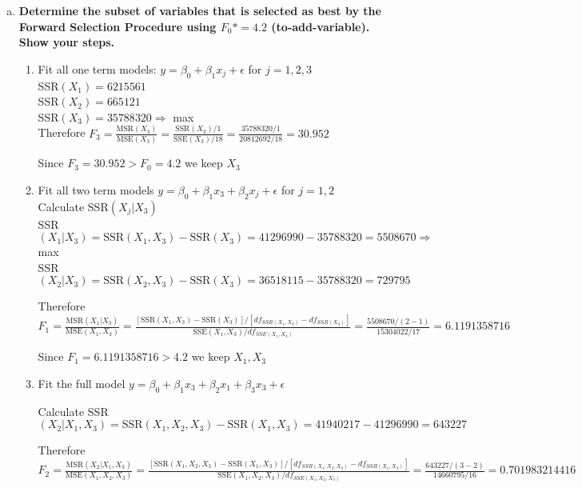 \documentclass{article}
\begin{document}
\begin{enumerate}[(a)]
\item \textbf{Determine the subset of variables that is selected as best by the Forward Selection Procedure using $F_0* = 4.2$ (to-add-variable). Show your steps. }

\begin{enumerate}[(1)]
\item Fit all one term models: $y = \beta_0 + \beta_1x_j + \epsilon$ for $j = 1,2,3$ \\
SSR$(X_1) = 6 215 561$ \\
SSR$(X_2) = 665 121$ \\
SSR$(X_3) = 35 788 320 \Rightarrow $ max \\

Therefore $F_3 = \frac{\text{MSR}(X_3)}{\text{MSE}(X_3)} = \frac{\text{SSR}(X_3)/1}{\text{SSE}(X_3)/18} = \frac{35 788 320/1}{20 812 692/18} = 30.952$

Since $F_3 = 30.952 > F_0 = 4.2$ we keep $X_3$

\item Fit all two term models $y = \beta_0 + \beta_1x_3 + \beta_2x_j + \epsilon$ for $j = 1,2$ \\

Calculate SSR$(X_j | X_3)$ \\

SSR$(X_1 | X_3) = \text{SSR}(X_1, X_3) - \text{SSR}(X_3) = 41 296 990 - 35 788 320 = 5 508 670 \Rightarrow$ max\\ 
SSR$(X_2 | X_3) = \text{SSR}(X_2, X_3) - \text{SSR}(X_3) = 36 518 115 - 35 788 320 = 729 795$

Therefore $F_1 = \frac{  \text{MSR}(X_1 | X_3) }{  \text{MSE}(X_1, X_3) } = 
\frac{ [ \text{SSR}(X_1, X_3) - \text{SSR}(X_3) ] / [ df_{SSR(X_1, X_3)} - df_{SSR(X_3)} ]
}{
\text{SSE}(X_1, X_3) / df_{SSE(X_1, X_3)}
}
=  \frac{
 5 508 670 / (2- 1)
}{
15 304 022 / 17
} = 6.1191358716$

Since $F_1 = 6.1191358716 > 4.2$ we keep $X_1, X_3$

\item Fit the full model $y = \beta_0 + \beta_1x_3 + \beta_2x_1 + \beta_3x_3 + \epsilon$

Calculate SSR$(X_2 | X_1, X_3) = \text{SSR}(X_1, X_2, X_3) - \text{SSR}(X_1, X_3) = 41 940 217  - 41 296 990 = 643227$

Therefore $F_2 = \frac{  \text{MSR}(X_2 | X_1, X_3) }{  \text{MSE}(X_1, X_2, X_3) } = 
\frac{ [ \text{SSR}(X_1,X_2, X_3) - \text{SSR}(X_1, X_3) ] / [ df_{SSR(X_1,X_2, X_3)} - df_{SSR(X_1, X_3)} ]
}{
\text{SSE}(X_1,X_2, X_3) / df_{SSE(X_1, X_2, X_3)}
}
=  \frac{
643 227 / (3 - 2)
}{
14 660 795 / 16
} = 0.701983214416$


\end{enumerate}
\end{enumerate}
\end{document}

